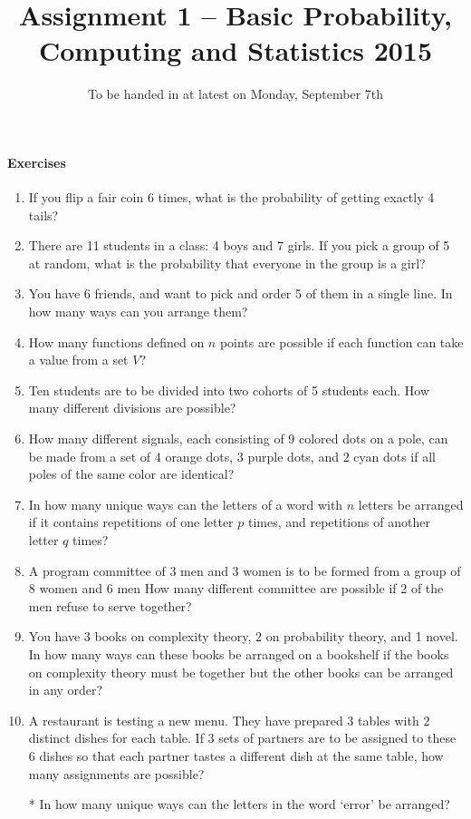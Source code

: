 \documentclass{article}
\title{Assignment 1 -- Basic Probability, Computing and Statistics 2015}
\author{}
\date{To be handed in at latest on Monday, September 7th}
\begin{document}
\maketitle

\paragraph{Exercises}

\begin{enumerate}
	\item If you flip a fair coin 6 times, what is the probability of getting exactly 4 tails?
	\item There are 11 students in a class: 4 boys and 7 girls. If you pick a group of 5 at random, what is the probability that everyone in the group is a girl?
	\item You have 6 friends, and want to pick and order 5 of them in a single line. In how many ways can you arrange them?
	\item How many functions defined on $n$ points are possible if each function can take a value from a set $V$?
	\item Ten students are to be divided into two cohorts of 5 students each. How many different divisions are possible? 
	\item How many different signals, each consisting of 9 colored dots on a pole, can be made from a set of 4 orange dots, 3 purple dots, and 2 cyan dots if all poles of the same color are identical?
	\item In how many unique ways can the letters of a word with $n$ letters be arranged if it contains repetitions of one letter $p$ times, and repetitions of another letter $q$ times?
	\item A program committee of 3 men and 3 women is to be formed from a group of 8 women and 6 men How many different committee are possible if 2 of the men refuse to serve together?
	\item You have 3 books on complexity theory, 2 on probability theory, and 1 novel. In how many ways can these books be arranged on a bookshelf if the books on complexity theory must be together but the other books can be arranged in any order?
	\item A restaurant is testing a new menu. They have prepared 3 tables with 2 distinct dishes for each table. If 3 sets of partners are to be assigned to these 6 dishes so that each partner tastes a different dish at the same table, how many assignments are possible?
	\item[*] In how many unique ways can the letters in the word `error' be arranged?

\end{enumerate}
\end{document}
